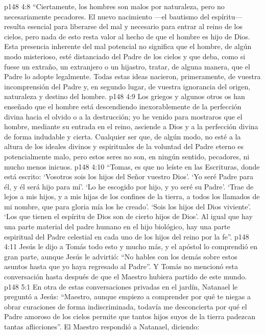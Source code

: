 \vs p148 4:8 “Ciertamente, los hombres son malos por naturaleza, pero no necesariamente pecadores. El nuevo nacimiento ---el bautismo del espíritu--- resulta esencial para liberarse del mal y necesario para entrar al reino de los cielos, pero nada de esto resta valor al hecho de que el hombre es hijo de Dios. Esta presencia inherente del mal potencial no significa que el hombre, de algún modo misterioso, esté distanciado del Padre de los cielos y que deba, como si fuese un extraño, un extranjero o un hijastro, tratar, de alguna manera, que el Padre lo adopte legalmente. Todas estas ideas nacieron, primeramente, de vuestra incomprensión del Padre y, en segundo lugar, de vuestra ignorancia del origen, naturaleza y destino del hombre.
\vs p148 4:9 Los griegos y algunos otros os han enseñado que el hombre está descendiendo inexorablemente de la perfección divina hacia el olvido o a la destrucción; yo he venido para mostraros que el hombre, mediante su entrada en el reino, asciende a Dios y a la perfección divina de forma indudable y cierta. Cualquier ser que, de algún modo, no esté a la altura de los ideales divinos y espirituales de la voluntad del Padre eterno es potencialmente malo, pero estos seres no son, en ningún sentido, pecadores, ni mucho menos inicuos.
\vs p148 4:10 “Tomas, es que no leíste en las Escrituras, donde está escrito: ‘Vosotros sois los hijos del Señor vuestro Dios’. ‘Yo seré Padre para él, y él será hijo para mí’. ‘Lo he escogido por hijo, y yo seré su Padre’. ‘Trae de lejos a mis hijos, y a mis hijas de los confines de la tierra, a todos los llamados de mi nombre, que para gloria mía los he creado’. ‘Sois los hijos del Dios viviente’. ‘Los que tienen el espíritu de Dios son de cierto hijos de Dios’. Al igual que hay una parte material del padre humano en el hijo biológico, hay una parte espiritual del Padre celestial en cada uno de los hijos del reino por la fe”.
\vs p148 4:11 \pc Jesús le dijo a Tomás todo esto y mucho más, y el apóstol lo comprendió en gran parte, aunque Jesús le advirtió: “No hables con los demás sobre estos asuntos hasta que yo haya regresado al Padre”. Y Tomás no mencionó esta conversación hasta después de que el Maestro hubiera partido de este mundo.
\vs p148 5:1 En otra de estas conversaciones privadas en el jardín, Natanael le preguntó a Jesús: “Maestro, aunque empiezo a comprender por qué te niegas a obrar curaciones de forma indiscriminada, todavía me desconcierta por qué el Padre amoroso de los cielos permite que tantos hijos suyos de la tierra padezcan tantas aflicciones”. El Maestro respondió a Natanael, diciendo:
